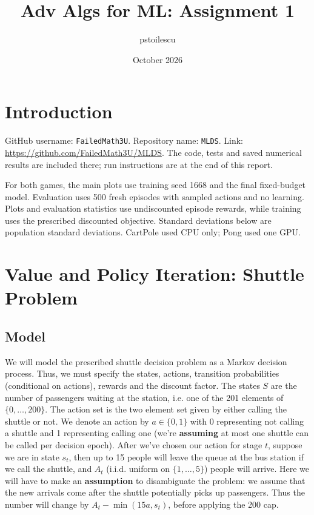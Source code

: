 \documentclass{article}
\title{Adv Algs for ML: Assignment 1}
\author{pstoilescu}
\date{October 2026}
\begin{document}
\maketitle

\section{Introduction}
GitHub username: \texttt{FailedMath3U}. Repository name: \texttt{MLDS}. Link: \url{https://github.com/FailedMath3U/MLDS}. The code, tests and saved numerical results are included there; run instructions are at the end of this report.

For both games, the main plots use training seed 1668 and the final fixed-budget model. Evaluation uses 500 fresh episodes with sampled actions and no learning. Plots and evaluation statistics use undiscounted episode rewards, while training uses the prescribed discounted objective. Standard deviations below are population standard deviations. CartPole used CPU only; Pong used one GPU.

\section{Value and Policy Iteration: Shuttle Problem}
\subsection{Model}
We will model the prescribed shuttle decision problem as a Markov decision process. Thus, we must specify the states, actions, transition probabilities (conditional on actions), rewards and the discount factor. The states $S$ are the number of passengers waiting at the station, i.e. one of the 201 elements of $\{0,\ldots,200\}$. The action set is the two element set given by either calling the shuttle or not. We denote an action by $a\in \{0,1\}$ with 0 representing not calling a shuttle and 1 representing calling one (we're \textbf{assuming} at most one shuttle can be called per decision epoch). After we've chosen our action for stage $t$, suppose we are in state $s_t$, then up to 15 people will leave the queue at the bus station if we call the shuttle, and $A_t$ (i.i.d. uniform on $\{1,\ldots,5\}$) people will arrive. Here we will have to make an \textbf{assumption} to disambiguate the problem: we assume that the new arrivals come after the shuttle potentially picks up passengers. Thus the number will change by $A_t-\min(15a,s_t)$, before applying the 200 cap.
\end{document}
